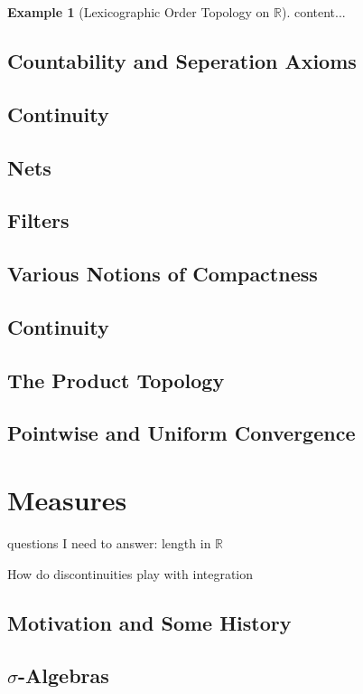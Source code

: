 \documentclass{article}
\newcommand{\R}{\mathbb{R}}
\theoremstyle{definition}
\newtheorem{example}{Example}[section]
\begin{document}
	\begin{example}[Lexicographic Order Topology on $\R$]
		content...
	\end{example}


		
	\subsection{Countability and Seperation Axioms}
	

	\subsection{Continuity}
	\subsection{Nets}
	\subsection{Filters}
	\subsection{Various Notions of Compactness}
	\subsection{Continuity}
	\subsection{The Product Topology}
	\subsection{Pointwise and Uniform Convergence}
	
	\section{Measures}
	questions I need to answer: length in $ \R $
	
	How do discontinuities play with integration
	\subsection{Motivation and Some History}
	
	\subsection{$ \sigma $-Algebras}
\end{document}

